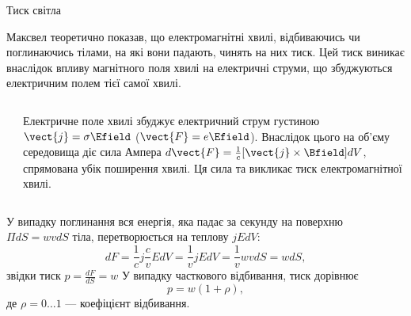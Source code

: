 \documentclass[onlytextwidth]{beamer}
\begin{document}
\begin{frame}{Тиск світла}{}\small
	\begin{block}{}\justifying
		Максвел теоретично показав, що електромагнітні хвилі, відбиваючись чи поглинаючись тілами, на які  вони падають, чинять на них тиск. Цей тиск виникає внаслідок впливу магнітного поля хвилі на електричні струми, що збуджуються електричним полем тієї самої хвилі.
	\end{block}
	\begin{columns}
		\begin{column}{0.4\linewidth}\centering
			
		\end{column}
		\begin{column}{0.6\linewidth}
			\begin{block}{}\justifying\small
				Електричне поле хвилі збуджує електричний струм густиною $ \vect{j} = \sigma\Efield $ ($ \vect{F} = e\Efield $). Внаслідок цього на
				об'єму середовища діє сила Ампера $ d\vect{F} = \frac1c[\vect{j}\times\Bfield] dV$, спрямована убік поширення хвилі. Ця сила та викликає
				тиск електромагнітної хвилі.
			\end{block}
		\end{column}
	\end{columns}
	\begin{block}{}\justifying\small
		\begin{overprint}
			У випадку поглинання вся енергія, яка падає за секунду на поверхню $\Pi dS = wv dS$ тіла, перетворюється на теплову $ jE dV $:
			\begin{equation*}
				dF = \frac1c j \frac{c}{v}E dV = \frac1vjE dV = \frac1v wvdS = w dS,
			\end{equation*}
			звідки тиск $ p = \frac{dF}{dS} = w $
			\onslide<2>
			У випадку часткового відбивання, тиск дорівнює
			\begin{equation*}
				p = w (1 + \rho),
			\end{equation*}
			де $ \rho = 0 \ldots 1$ --- коефіцієнт відбивання.
		\end{overprint}
	\end{block}
\end{frame}
\end{document}
